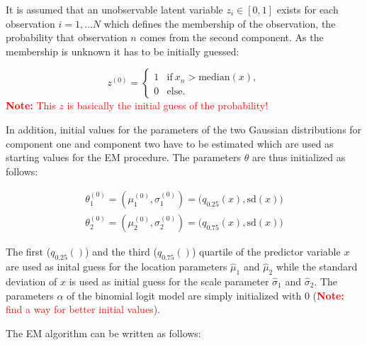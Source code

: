 \documentclass[article,nojss,shortnames]{jss}
\newcommand{\note}[1]{\textcolor{red}{\textbf{Note:} #1}}
\begin{document}
It is assumed that an unobservable latent variable $z_i \in [0,1]$ exists
for each observation $i=1, \dots N$ which defines the membership of the observation,
the probability that observation $n$ comes from the second component.
As the membership is unknown it has to be initially guessed:

\begin{equation}
    \mathit{z}^{(0)} = \begin{cases}
        1 & \text{if}~x_n > \text{median}(x), \\
        0 & \text{else}.
    \end{cases}
    \label{eqn:init-zn}
\end{equation}
\note{This $z$ is basically the initial guess of the probability!}

In addition, initial values for the parameters of the two Gaussian distributions
for component one and component two have to be estimated which are used as starting
values for the EM procedure. The parameters $\mathit{\theta}$ are thus initialized
as follows:

\begin{equation}
    \begin{split}
        \mathit{\theta}_1^{(0)} = (\mu_1^{(0)}, \sigma_1^{(0)}) = \Big(q_{0.25}(x), \text{sd}(x)\Big) \\
        \mathit{\theta}_2^{(0)} = (\mu_2^{(0)}, \sigma_2^{(0)}) = \Big(q_{0.75}(x), \text{sd}(x)\Big)
    \end{split}
    \label{eqn:init-theta}
\end{equation}

The first ($q_{0.25}()$) and the third ($q_{0.75}()$) quartile of the predictor 
variable $\mathit{x}$ are used as inital guess for the location parameters
$\hat{\mu}_1$ and $\hat{\mu}_2$ while the standard deviation of $\mathit{x}$ is used as initial
guess for the scale parameter $\hat{\sigma}_1$ and $\hat{\sigma}_2$.
The parameters $\mathit{\alpha}$ of the binomial logit model are simply initialized
with $0$ (\note{find a way for better initial values}).



The EM algorithm can be written as follows:
\end{document}
